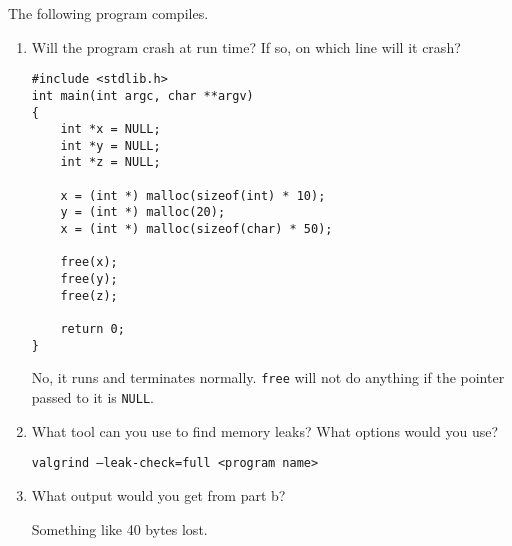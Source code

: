 
The following program compiles.
\begin{enumerate}
\item Will the program crash at run time? If so, on which line will it crash?

\begin{lstlisting}
#include <stdlib.h>
int main(int argc, char **argv)
{
	int *x = NULL;
	int *y = NULL;
	int *z = NULL;

	x = (int *) malloc(sizeof(int) * 10);
	y = (int *) malloc(20);
	x = (int *) malloc(sizeof(char) * 50);

	free(x);
	free(y);
	free(z);

	return 0;
}
\end{lstlisting}

\begin{answer}
No, it runs and terminates normally.
\texttt{free} will not do anything if the pointer passed to it is \texttt{NULL}.
\end{answer}

\item What tool can you use to find memory leaks? What options would you use?

\begin{answer}
\texttt{valgrind --leak-check=full <program name>}
\end{answer}

\item What output would you get from part b?

\begin{answer}
Something like 40 bytes lost.
\end{answer}
\end{enumerate}

